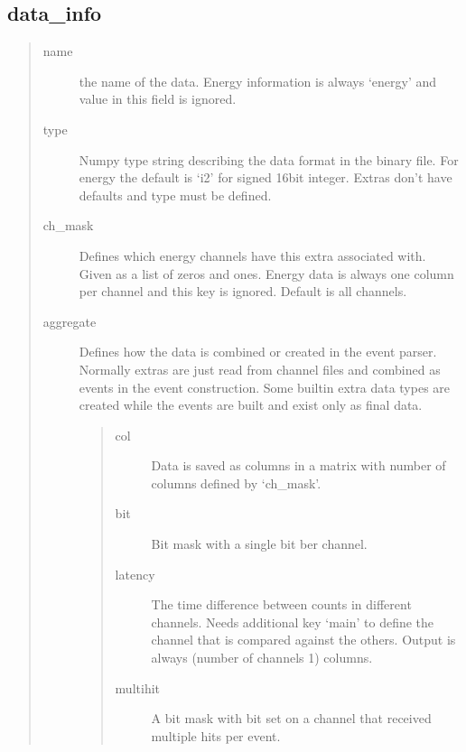 \documentclass[letterpaper,10pt,english]{sphinxmanual}
\begin{document}
\subsection{data\_info}
\label{\detokenize{manual/configuration:data-info}}\begin{quote}\begin{description}
\item[{name}] \leavevmode
\sphinxAtStartPar
the name of the data. Energy information is always ‘energy’ and value in this field is
ignored.

\item[{type}] \leavevmode
\sphinxAtStartPar
Numpy type string describing the data format in the binary file. For energy the default
is ‘i2’ for signed 16\sphinxhyphen{}bit integer. Extras don’t have defaults and type must be defined.

\item[{ch\_mask}] \leavevmode
\sphinxAtStartPar
Defines which energy channels have this extra associated with. Given as a list of zeros
and ones. Energy data is always one column per channel and this key is ignored. Default
is all channels.

\item[{aggregate}] \leavevmode
\sphinxAtStartPar
Defines how the data is combined or created in the event parser. Normally extras are just
read from channel files and combined as events in the event construction. Some builtin
extra data types are created while the events are built and exist only as final data.
\begin{quote}\begin{description}
\item[{col}] \leavevmode
\sphinxAtStartPar
Data is saved as columns in a matrix with number of columns defined by ‘ch\_mask’.

\item[{bit}] \leavevmode
\sphinxAtStartPar
Bit mask with a single bit ber channel.

\item[{latency}] \leavevmode
\sphinxAtStartPar
{} The time difference between counts in different channels. Needs
additional key ‘main’ to define the channel that is compared against the others.
Output is always (number of channels \sphinxhyphen{} 1) columns.

\item[{multihit}] \leavevmode
\sphinxAtStartPar
{} A bit mask with bit set on a channel that received multiple
hits per event.


\end{description}
\end{quote}
\end{description}
\end{quote}
\end{document}
